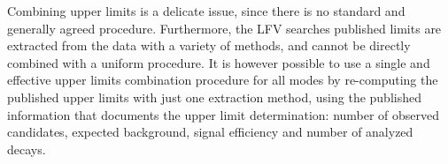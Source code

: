 \label{sec:tau:lfv-comb}
\newcommand{\cls}{\ensuremath{CL_s}\xspace}

Combining upper limits is a delicate issue, since there is no standard and
generally agreed procedure. Furthermore, the \mtau LFV searches
published limits are extracted from the data with a variety of
methods, and cannot be directly combined with a uniform procedure. It
is however possible to use a single and effective
upper limits combination procedure for all modes by re-computing the published upper
limits with just one extraction method, using the published
information that documents the upper limit determination:
number of observed candidates, expected background, signal efficiency and
number of analyzed \mtau decays.

